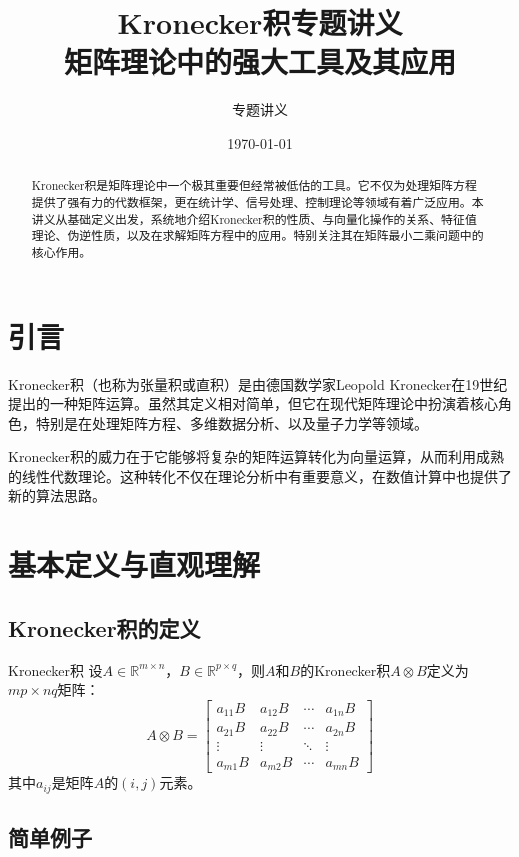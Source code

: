 \documentclass[11pt,a4paper]{ctexart}
\title{\textbf{Kronecker积专题讲义} \\ 
       \large 矩阵理论中的强大工具及其应用}
\author{专题讲义}
\date{\today}
\theoremstyle{definition}
\newcommand{\RR}{\mathbb{R}}
\begin{document}
\maketitle

\begin{abstract}
Kronecker积是矩阵理论中一个极其重要但经常被低估的工具。它不仅为处理矩阵方程提供了强有力的代数框架，更在统计学、信号处理、控制理论等领域有着广泛应用。本讲义从基础定义出发，系统地介绍Kronecker积的性质、与向量化操作的关系、特征值理论、伪逆性质，以及在求解矩阵方程中的应用。特别关注其在矩阵最小二乘问题中的核心作用。
\end{abstract}

\tableofcontents
\newpage

\section{引言}

Kronecker积（也称为张量积或直积）是由德国数学家Leopold Kronecker在19世纪提出的一种矩阵运算。虽然其定义相对简单，但它在现代矩阵理论中扮演着核心角色，特别是在处理矩阵方程、多维数据分析、以及量子力学等领域。

Kronecker积的威力在于它能够将复杂的矩阵运算转化为向量运算，从而利用成熟的线性代数理论。这种转化不仅在理论分析中有重要意义，在数值计算中也提供了新的算法思路。

\section{基本定义与直观理解}

\subsection{Kronecker积的定义}

\begin{importantdef}{Kronecker积}
设$A \in \RR^{m \times n}$，$B \in \RR^{p \times q}$，则$A$和$B$的Kronecker积$A \otimes B$定义为$mp \times nq$矩阵：
$$A \otimes B = \begin{bmatrix}
a_{11}B & a_{12}B & \cdots & a_{1n}B \\
a_{21}B & a_{22}B & \cdots & a_{2n}B \\
\vdots & \vdots & \ddots & \vdots \\
a_{m1}B & a_{m2}B & \cdots & a_{mn}B
\end{bmatrix}$$
其中$a_{ij}$是矩阵$A$的$(i,j)$元素。
\end{importantdef}

\subsection{简单例子}
\end{document}
